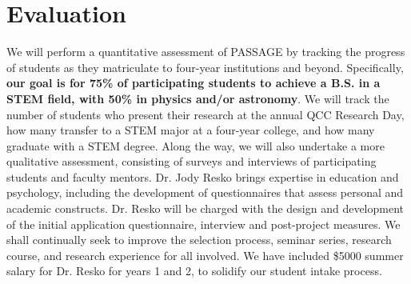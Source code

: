 \documentclass[12pt]{article}
\newcommand\new[1]{{\color{blue}#1}}
\begin{document}
\vspace{-5mm}


\section{\large{Evaluation}}
\vspace{-3mm}



We will perform a quantitative assessment of PASSAGE by tracking the progress of students as they matriculate to four-year institutions and beyond. Specifically, {\bf our goal is for 75\% of participating students to achieve a B.S. in a STEM field, with 50\% in physics and/or astronomy}. We will track the number of students who present their research at the annual QCC Research Day, how many transfer to a STEM major at a four-year college, and how many graduate with a STEM degree.  Along the way, we will also undertake a more qualitative assessment, consisting of surveys and interviews of participating students and faculty mentors.  \new{Dr. Jody Resko brings expertise in education and psychology, including the development of questionnaires that assess personal and academic constructs.  Dr. Resko will be charged with the design and development of the initial application questionnaire, interview and post-project measures.} We shall continually seek to improve the selection process, seminar series, research course, and research experience for all involved.  \new{We have included \$5000 summer salary for Dr. Resko for years 1 and 2, to solidify our student intake process.}
\end{document}
